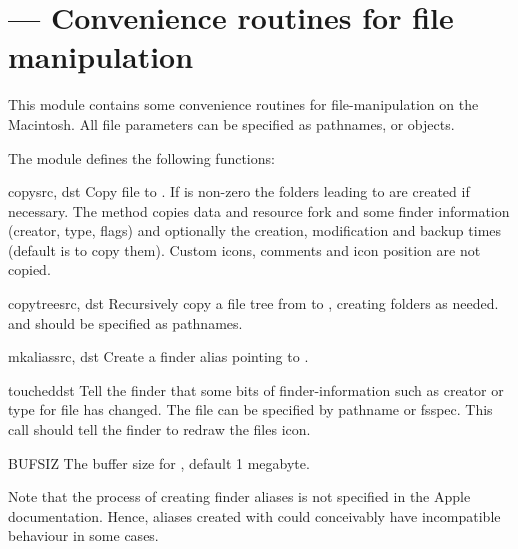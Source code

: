 \section{ ---
         Convenience routines for file manipulation}



This module contains some convenience routines for file-manipulation
on the Macintosh. All file parameters can be specified as
pathnames,  or  objects.

The  module defines the following functions:


\begin{funcdesc}{copy}{src, dst}
Copy file  to .  If  is non-zero
the folders leading to  are created if necessary.
The method copies data and
resource fork and some finder information (creator, type, flags) and
optionally the creation, modification and backup times (default is to
copy them). Custom icons, comments and icon position are not copied.
\end{funcdesc}

\begin{funcdesc}{copytree}{src, dst}
Recursively copy a file tree from  to , creating
folders as needed.  and  should be specified as
pathnames.
\end{funcdesc}

\begin{funcdesc}{mkalias}{src, dst}
Create a finder alias  pointing to .
\end{funcdesc}

\begin{funcdesc}{touched}{dst}
Tell the finder that some bits of finder-information such as creator
or type for file  has changed. The file can be specified by
pathname or fsspec. This call should tell the finder to redraw the
files icon.
\end{funcdesc}

\begin{datadesc}{BUFSIZ}
The buffer size for , default 1 megabyte.
\end{datadesc}

Note that the process of creating finder aliases is not specified in
the Apple documentation. Hence, aliases created with 
could conceivably have incompatible behaviour in some cases.


